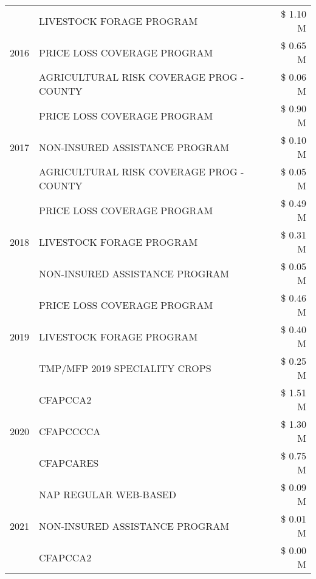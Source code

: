 \begin{tabular}{llr}
\cline{1-3}
\multirow[t]{3}{*}{2016} & LIVESTOCK FORAGE PROGRAM & \$ 1.10 M \\
 & PRICE LOSS COVERAGE PROGRAM & \$ 0.65 M \\
 & AGRICULTURAL RISK COVERAGE PROG - COUNTY & \$ 0.06 M \\
\cline{1-3}
\multirow[t]{3}{*}{2017} & PRICE LOSS COVERAGE PROGRAM & \$ 0.90 M \\
 & NON-INSURED ASSISTANCE PROGRAM & \$ 0.10 M \\
 & AGRICULTURAL RISK COVERAGE PROG - COUNTY & \$ 0.05 M \\
\cline{1-3}
\multirow[t]{3}{*}{2018} & PRICE LOSS COVERAGE PROGRAM & \$ 0.49 M \\
 & LIVESTOCK FORAGE PROGRAM & \$ 0.31 M \\
 & NON-INSURED ASSISTANCE PROGRAM & \$ 0.05 M \\
\cline{1-3}
\multirow[t]{3}{*}{2019} & PRICE LOSS COVERAGE PROGRAM & \$ 0.46 M \\
 & LIVESTOCK FORAGE PROGRAM & \$ 0.40 M \\
 & TMP/MFP 2019 SPECIALITY CROPS & \$ 0.25 M \\
\cline{1-3}
\multirow[t]{3}{*}{2020} & CFAPCCA2 & \$ 1.51 M \\
 & CFAPCCCCA & \$ 1.30 M \\
 & CFAPCARES & \$ 0.75 M \\
\cline{1-3}
\multirow[t]{3}{*}{2021} & NAP REGULAR WEB-BASED & \$ 0.09 M \\
 & NON-INSURED ASSISTANCE PROGRAM & \$ 0.01 M \\
 & CFAPCCA2 & \$ 0.00 M \\
\cline{1-3}
\bottomrule
\end{tabular}
